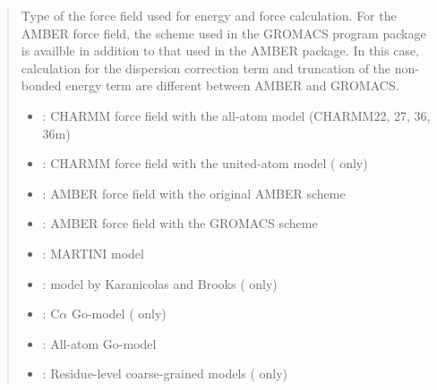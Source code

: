 \documentclass[a4paper,11pt,oneside,english]{sphinxmanual}
\begin{document}
\begin{quote}


Type of the force field used for energy and force calculation.
For the AMBER force field, the scheme used in the GROMACS program package
is availble in addition to that used in the AMBER package.
In this case, calculation for the dispersion correction term and
truncation of the non-bonded energy term are different between AMBER and GROMACS.
\begin{itemize}
\item {} 
: CHARMM force field with the all-atom model (CHARMM22, 27, 36, 36m)    

\item {} 
: CHARMM force field with the united-atom model ( only)

\item {} 
: AMBER force field with the original AMBER scheme 

\item {} 
: AMBER force field with the GROMACS scheme

\item {} 
: MARTINI model  

\item {} 
: model by Karanicolas and Brooks   ( only)

\item {} 
: C\(\alpha\) Go-model  ( only)

\item {} 
: All-atom Go-model 

\item {} 
: Residue-level coarse-grained models ( only)

\end{itemize}
\end{quote}
\end{document}
